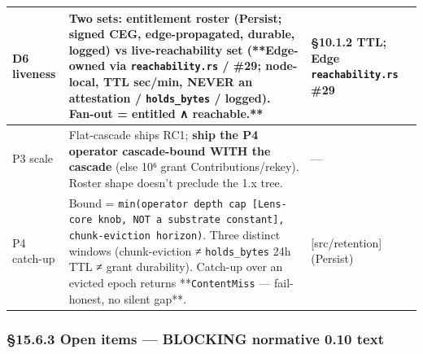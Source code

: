 \documentclass[10pt]{article}
\begin{document}
{\begin{longtable}{|p{5.33cm}|p{5.33cm}|p{5.33cm}|}
D6 liveness & Two sets: \textbf{entitlement roster} (Persist; signed CEG, edge-propagated, durable, logged) vs \textbf{live-reachability set} (**Edge-owned via \texttt{reachability.rs} / \#29\textbf{; node-local, TTL sec/min, }NEVER an attestation / \texttt{holds\_bytes} / logged\textbf{). }Fan-out = entitled ∧ reachable.** & §10.1.2 TTL; Edge \texttt{reachability.rs} \#29 \\ \hline
P3 scale & Flat-cascade ships RC1; \textbf{ship the P4 operator cascade-bound WITH the cascade} (else 10⁶ grant Contributions/rekey). Roster shape doesn't preclude the 1.x tree. & — \\ \hline
P4 catch-up & Bound = \texttt{min(operator depth cap [Lens-core knob, NOT a substrate constant], chunk-eviction horizon)}. Three distinct windows (chunk-eviction ≠ \texttt{holds\_bytes} 24h TTL ≠ grant durability). Catch-up over an evicted epoch returns **\texttt{ContentMiss} — fail-honest, no silent gap**. & [src/retention] (Persist) \\ \hline
\end{longtable}}


\subsubsection*{§15.6.3 Open items — BLOCKING normative 0.10 text}
\end{document}
